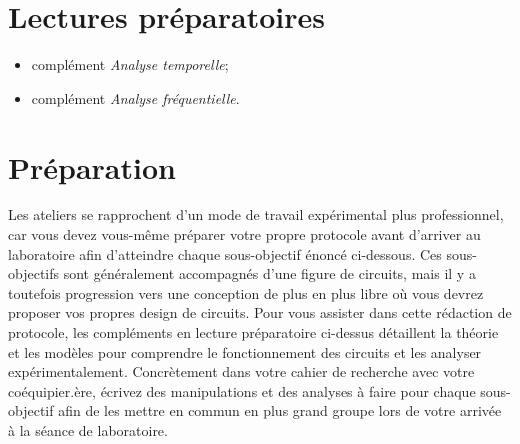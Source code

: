 \documentclass[canadien,12pt,oneside,letterpaper]{article}
\begin{document}

\section{Lectures préparatoires}

\begin{itemize}
\item complément \textit{Analyse temporelle};
\item complément \textit{Analyse fréquentielle}.
\end{itemize}





\section{Préparation}

\setlength{\parskip}{1ex plus 0.5ex minus 0.2ex}
Les ateliers se rapprochent d'un mode de travail expérimental plus professionnel, car vous devez vous-même préparer votre propre protocole avant d'arriver au laboratoire afin d'atteindre chaque sous-objectif énoncé ci-dessous. Ces sous-objectifs sont généralement accompagnés d'une figure de circuits, mais il y a toutefois progression vers une conception de plus en plus libre où vous devrez proposer vos propres design de circuits. Pour vous assister dans cette rédaction de protocole, les compléments en lecture préparatoire ci-dessus détaillent la théorie et les modèles pour comprendre le fonctionnement des circuits et les analyser expérimentalement. Concrètement dans votre cahier de recherche avec votre coéquipier.ère, écrivez des manipulations et des analyses à faire pour chaque sous-objectif afin de les mettre en commun en plus grand groupe lors de votre arrivée à la séance de laboratoire. 
\end{document}

